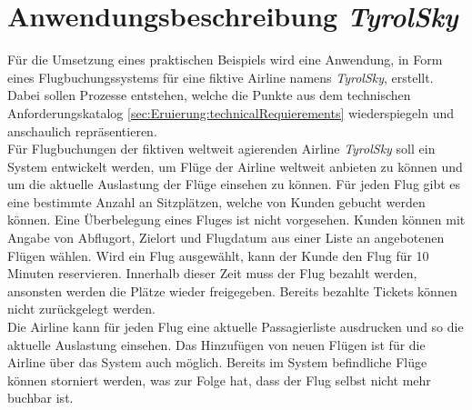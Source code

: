 \section{Anwendungsbeschreibung \textit{TyrolSky}}
Für die Umsetzung eines praktischen Beispiels wird eine Anwendung, in Form eines Flugbuchungssystems für eine fiktive Airline namens \textit{TyrolSky}, erstellt. Dabei sollen Prozesse entstehen, welche die Punkte aus dem technischen Anforderungskatalog \ref{sec:Eruierung:technicalRequierements} wiederspiegeln und anschaulich repräsentieren. \\
Für Flugbuchungen der fiktiven weltweit agierenden Airline \textit{TyrolSky} soll ein System entwickelt werden, um Flüge der Airline weltweit anbieten zu können und um die aktuelle Auslastung der Flüge einsehen zu können. Für jeden Flug gibt es eine bestimmte Anzahl an Sitzplätzen, welche von Kunden gebucht werden können. Eine Überbelegung eines Fluges ist nicht vorgesehen. Kunden können mit Angabe von Abflugort, Zielort und Flugdatum aus einer Liste an angebotenen Flügen wählen. Wird ein Flug ausgewählt, kann der Kunde den Flug für 10 Minuten reservieren. Innerhalb dieser Zeit muss der Flug bezahlt werden, ansonsten werden die Plätze wieder freigegeben. Bereits bezahlte Tickets können nicht zurückgelegt werden.  \\
Die Airline kann für jeden Flug eine aktuelle Passagierliste ausdrucken und so die aktuelle Auslastung einsehen. Das Hinzufügen von neuen Flügen ist für die Airline über das System auch möglich. Bereits im System befindliche Flüge können storniert werden, was zur Folge hat, dass der Flug selbst nicht mehr buchbar ist. \\


